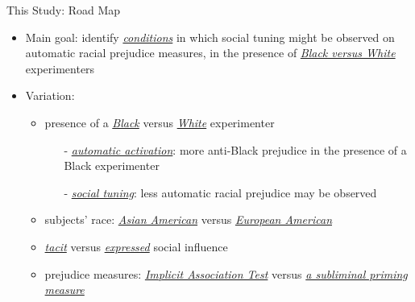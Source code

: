 \begin{frame}{This Study: Road Map}
    \begin{itemize}
        \item<+-> Main goal: identify \textcolor{lightlavender!55!white}{\textit{\underline{conditions}}} in which social tuning might be observed on automatic racial prejudice measures, in the presence of \textcolor{lightlavender!55!white}{\textit{\underline{Black versus White}}} experimenters
        \item<+-> Variation:
        \begin{itemize}
            \item<+->[\textcolor{lightlavender!55!white}{\textbf{E1}}] presence of a \textcolor{lightlavender!55!white}{\textit{\underline{Black}}} versus \textcolor{lightlavender!55!white}{\textit{\underline{White}}} experimenter
            \begin{itemize}
                \item[-] \textit{\underline{automatic activation}}: more anti-Black prejudice in the presence of a Black experimenter
                \item[-] \textit{\underline{social tuning}}: less automatic racial prejudice may be observed
            \end{itemize}
            \item<+->[\textcolor{lightlavender!55!white}{\textbf{E2}}] subjects' race: \textcolor{lightlavender!55!white}{\textit{\underline{Asian American}}} versus \textcolor{lightlavender!55!white}{\textit{\underline{European American}}}
            \item<+->[\textcolor{lightlavender!55!white}{\textbf{E3}}] \textcolor{lightlavender!55!white}{\textit{\underline{tacit}}} versus \textcolor{lightlavender!55!white}{\textit{\underline{expressed}}} social influence 
            \item<+->[\textcolor{lightlavender!55!white}{\textbf{E4}}] prejudice measures: \textcolor{lightlavender!55!white}{\textit{\underline{Implicit Association Test}}} {\scriptsize\citep[IAT,][]{greenwald1998measuring}} versus \textcolor{lightlavender!55!white}{\textit{\underline{a subliminal priming measure}}}
        \end{itemize}
    \end{itemize}


\end{frame}
